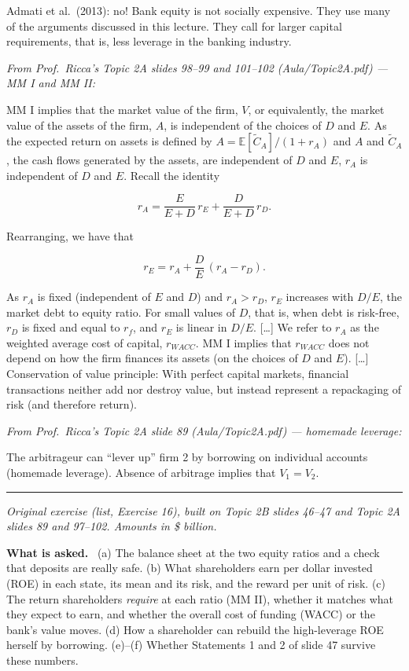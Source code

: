 \documentclass[11pt,a4paper]{article}
\numberwithin{equation}{section}
\newcommand{\asked}{\par\medskip\noindent\textbf{What is asked.}~}
\newcommand{\stmtend}{\par\endgroup\nopagebreak\noindent\rule{\linewidth}{0.4pt}\par\medskip}
\begin{document}
Admati et al.~(2013): no! Bank equity is not socially expensive. They use many of the arguments
discussed in this lecture. They call for larger capital requirements, that is, less leverage in the
banking industry.

\emph{From Prof.~Ricca's Topic 2A slides 98--99 and 101--102 (Aula/Topic2A.pdf) --- MM I and MM II:}

MM I implies that the market value of the firm, \(V\), or equivalently, the market value of the
assets of the firm, \(A\), is independent of the choices of \(D\) and \(E\). As the expected return
on assets is defined by \(A = \mathbb{E}[\tilde C_A]/(1 + r_A)\) and \(A\) and \(\tilde C_A\), the
cash flows generated by the assets, are independent of \(D\) and \(E\), \(r_A\) is independent of
\(D\) and \(E\). Recall the identity

\[r_A = \frac{E}{E + D}\,r_E + \frac{D}{E + D}\,r_D.\]

Rearranging, we have that

\[r_E = r_A + \frac{D}{E}\,(r_A - r_D).\]

As \(r_A\) is fixed (independent of \(E\) and \(D\)) and \(r_A > r_D\), \(r_E\) increases with
\(D/E\), the market debt to equity ratio. For small values of \(D\), that is, when debt is
risk-free, \(r_D\) is fixed and equal to \(r_f\), and \(r_E\) is linear in \(D/E\). {[}\ldots{]} We
refer to \(r_A\) as the weighted average cost of capital, \(r_{WACC}\). MM I implies that
\(r_{WACC}\) does not depend on how the firm finances its assets (on the choices of \(D\) and
\(E\)). {[}\ldots{]} Conservation of value principle: With perfect capital markets, financial
transactions neither add nor destroy value, but instead represent a repackaging of risk (and
therefore return).

\emph{From Prof.~Ricca's Topic 2A slide 89 (Aula/Topic2A.pdf) --- homemade leverage:}

The arbitrageur can ``lever up'' firm 2 by borrowing on individual accounts (homemade leverage).
Absence of arbitrage implies that \(V_1 = V_2\).
\stmtend

\noindent\textit{Original exercise (list, Exercise 16), built on Topic 2B slides 46--47 and Topic 2A
slides 89 and 97--102. Amounts in \$ billion.}

\asked
(a) The balance sheet at the two equity ratios and a check that deposits are really safe.
(b) What shareholders earn per dollar invested (ROE) in each state, its mean and its risk, and the
reward per unit of risk.
(c) The return shareholders \emph{require} at each ratio (MM II), whether it matches what they
expect to earn, and whether the overall cost of funding (WACC) or the bank's value moves.
(d) How a shareholder can rebuild the high-leverage ROE herself by borrowing.
(e)--(f) Whether Statements 1 and 2 of slide 47 survive these numbers.
\end{document}
